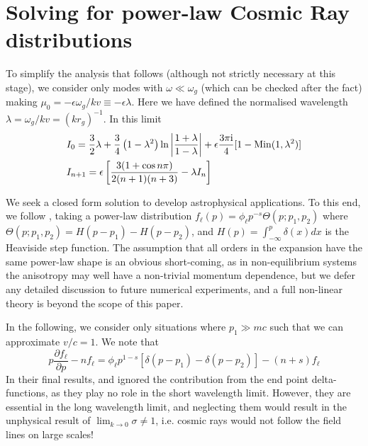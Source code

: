 \documentclass[a4paper,fleqn,usenatbib]{mnras}
\begin{document}
\section{Solving for power-law Cosmic Ray distributions}

To simplify the analysis that follows (although not strictly necessary at this stage), we consider only modes with $\omega \ll \omega_g$ (which can be checked after the fact) making $\mu_0= - \epsilon \omega_g/kv \equiv - \epsilon\lambda$. Here we have defined the normalised wavelength $\lambda = \omega_g/kv = (k r_g)^{-1}$.
In this limit
\begin{align*}
&I_0 =  \frac{3}{2} \lambda +\frac{3}{4} \left(1-\lambda^2\right)\ln\left|\frac{1+\lambda}{1-\lambda} \right| +  \epsilon \frac{3\pi {\rm i}}{4} [1-{\rm Min}(1,\lambda^2)]\\
 & I_{n+1} =  \epsilon  \left[  \frac{3(1+\cos n\pi)}{2(n+1)(n+3)}-\lambda I_n\right]
\end{align*} 
 
We seek a closed form solution to develop astrophysical applications. To this end, we  follow \cite{Bell04}, taking a power-law distribution $f_\ell(p) = \phi_\ell p^{-s} \Theta(p;p_1,p_2)$ where  $\Theta(p;p_1,p_2)=H(p-p_1) - H(p-p_2)$, 
and $H(p)=\int_{-\infty}^p \delta(x) dx$ is the Heaviside step function.  The assumption that all orders in the expansion have the same power-law shape is an obvious short-coming, as in non-equilibrium systems the anisotropy may well have a non-trivial momentum dependence, but we defer any detailed discussion to future numerical experiments, and a full non-linear theory is beyond the scope of this paper. 

In the following, we consider only situations where $p_1 \gg mc$ such that we can approximate $v/c =1$. We note that 
\begin{equation*}
p\frac{\partial f_\ell}{\partial p}-nf_\ell = \phi_\ell p^{1-s} \left[\delta(p-p_1) - \delta(p-p_2)\right] -(n+s) f_\ell 
\end{equation*}
In their final results, \cite{Bell04} and \cite{Reville07} ignored the contribution from the end point delta-functions, as they play no role in the short wavelength limit. However, they are essential in the long wavelength limit,  and neglecting them would result in the unphysical result of $\lim_{k\rightarrow 0}\sigma
\neq 1$, i.e. cosmic rays would not follow the field lines on large scales!
\end{document}

